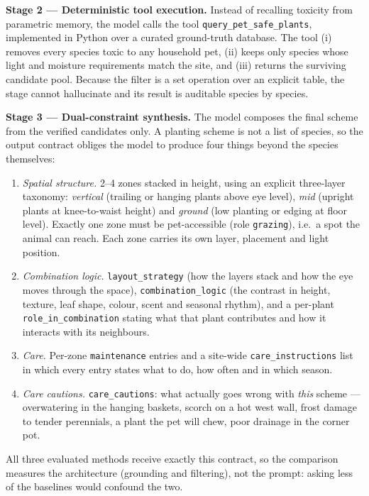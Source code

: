 \documentclass[12pt,a4paper]{article}
\begin{document}
\textbf{Stage 2 --- Deterministic tool execution.} Instead of recalling
toxicity from parametric memory, the model calls the tool
\texttt{query\_pet\_safe\_plants}, implemented in Python over a curated
ground-truth database. The tool (i) removes every species toxic to any
household pet, (ii) keeps only species whose light and moisture requirements
match the site, and (iii) returns the surviving candidate pool. Because the
filter is a set operation over an explicit table, the stage cannot
hallucinate and its result is auditable species by species.

\textbf{Stage 3 --- Dual-constraint synthesis.} The model composes the final
scheme from the verified candidates only. A planting scheme is not a list of
species, so the output contract obliges the model to produce four things
beyond the species themselves:

\begin{enumerate}[leftmargin=1.5em]
  \item \emph{Spatial structure.} 2--4 zones stacked in height, using an
    explicit three-layer taxonomy: \emph{vertical} (trailing or hanging
    plants above eye level), \emph{mid} (upright plants at knee-to-waist
    height) and \emph{ground} (low planting or edging at floor level). Exactly
    one zone must be pet-accessible (role \texttt{grazing}), i.e.\ a spot the
    animal can reach. Each zone carries its own layer, placement and light
    position.
  \item \emph{Combination logic.} \texttt{layout\_strategy} (how the layers
    stack and how the eye moves through the space), \texttt{combination\_logic}
    (the contrast in height, texture, leaf shape, colour, scent and seasonal
    rhythm), and a per-plant \texttt{role\_in\_combination} stating what that
    plant contributes and how it interacts with its neighbours.
  \item \emph{Care.} Per-zone \texttt{maintenance} entries and a site-wide
    \texttt{care\_instructions} list in which every entry states what to do,
    how often and in which season.
  \item \emph{Care cautions.} \texttt{care\_cautions}: what actually goes
    wrong with \emph{this} scheme --- overwatering in the hanging baskets,
    scorch on a hot west wall, frost damage to tender perennials, a plant the
    pet will chew, poor drainage in the corner pot.
\end{enumerate}

All three evaluated methods receive exactly this contract, so the comparison
measures the architecture (grounding and filtering), not the prompt: asking
less of the baselines would confound the two.
\end{document}
